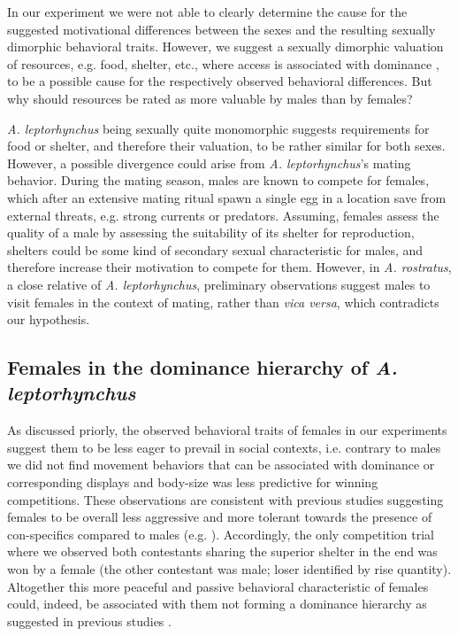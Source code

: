 \documentclass[11pt,pdftex]{article}
\newcommand{\lepto}{\textit{A. leptorhynchus}}
\newcommand{\rostratus}{\textit{A. rostratus}}
\begin{document}
In our experiment we were not able to clearly determine the cause for the suggested motivational differences between the sexes and the resulting sexually dimorphic behavioral traits. However, we suggest a sexually dimorphic valuation of resources, e.g. food, shelter, etc., where access is associated with dominance \citep{Janson1985, Blumstein2001, Charpentier2005, Dunham2008}, to be a possible cause for the respectively observed behavioral differences. But why should resources be rated as more valuable by males than by females? 

\lepto{} being sexually quite monomorphic suggests requirements for food or shelter, and therefore their valuation, to be rather similar for both sexes. However, a possible divergence could arise from \lepto{}'s mating behavior. During the mating season, males are known to compete for females, which after an extensive mating ritual spawn a single egg in a location save from external threats, e.g. strong currents or predators. Assuming, females assess the quality of a male by assessing the suitability of its shelter for reproduction, shelters could be some kind of secondary sexual characteristic for males, and therefore increase their motivation to compete for them. However, in \rostratus, a close relative of \lepto{}, preliminary observations suggest males to visit females in the context of mating, rather than \textit{vica versa}, which contradicts our hypothesis.  



\subsection{Females in the dominance hierarchy of \lepto{}}

As discussed priorly, the observed behavioral traits of females in our experiments suggest them to be less eager to prevail in social contexts, i.e. contrary to males we did not find movement behaviors that can be associated with dominance or corresponding displays and body-size was less predictive for winning competitions. These observations are consistent with previous studies suggesting females to be overall less aggressive and more tolerant towards the presence of con-specifics compared to males (e.g. \citealp{Dunlap2002}). Accordingly, the only competition trial where we observed both contestants sharing the superior shelter in the end was won by a female (the other contestant was male; loser identified by rise quantity). Altogether this more peaceful and passive behavioral characteristic of females could, indeed, be associated with them not forming a dominance hierarchy as suggested in previous studies \citep{Hagedorn1985, Dunlap2002}. 
\end{document}
